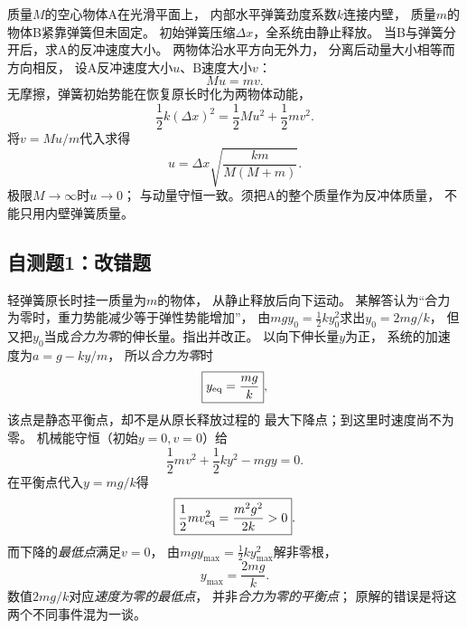 \problemtext 质量$M$的空心物体A在光滑平面上，
内部水平弹簧劲度系数$k$连接内壁，
质量$m$的物体B紧靠弹簧但未固定。
初始弹簧压缩$\Delta x$，全系统由静止释放。
当B与弹簧分开后，求A的反冲速度大小。
\workings
两物体沿水平方向无外力，
分离后动量大小相等而方向相反，
设A反冲速度大小$u$、B速度大小$v$：
\[
Mu=mv.
\]
无摩擦，弹簧初始势能在恢复原长时化为两物体动能，
\[
\frac12k(\Delta x)^2
=\frac12Mu^2+\frac12mv^2.
\]
将$v=Mu/m$代入求得
\[
\boxed{u=\Delta x\sqrt{\frac{km}{M(M+m)}}}.
\]
\crosscheck 极限$M\to\infty$时$u\to0$；
与动量守恒一致。须把A的整个质量作为反冲体质量，
不能只用内壁弹簧质量。

\subsection{自测题1：改错题}

\problemtext 轻弹簧原长时挂一质量为$m$的物体，
从静止释放后向下运动。
某解答认为“合力为零时，重力势能减少等于弹性势能增加”，
由$mg y_0=\tfrac12ky_0^2$求出$y_0=2mg/k$，
但又把$y_0$当成\emph{合力为零}的伸长量。指出并改正。
\workings
以向下伸长量$y$为正，
系统的加速度为$a=g-ky/m$，
所以\emph{合力为零}时
\[
\boxed{y_{\rm eq}=\frac{mg}{k}},
\]
该点是静态平衡点，却不是从原长释放过程的
最大下降点；到这里时速度尚不为零。
机械能守恒（初始$y=0,v=0$）给
\[
\frac12mv^2+\frac12ky^2-mgy=0.
\]
在平衡点代入$y=mg/k$得
\[
\boxed{\frac12mv_{\rm eq}^2=\frac{m^2g^2}{2k}>0}.
\]
而下降的\emph{最低点}满足$v=0$，
由$mg y_{\max}=\frac12ky_{\max}^2$解非零根，
\[
\boxed{y_{\max}=\frac{2mg}{k}}.
\]
\crosscheck 数值$2mg/k$对应\emph{速度为零的最低点}，
并非\emph{合力为零的平衡点}；
原解的错误是将这两个不同事件混为一谈。
